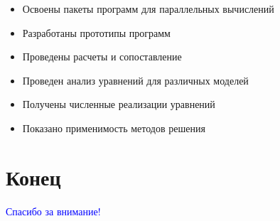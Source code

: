 \begin{frame}
\frametitle{\insertsection}
\framesubtitle{\insertsubsection}

\begin{itemize}
    \item Освоены пакеты программ для параллельных вычислений
    \item Разработаны прототипы программ
    \item Проведены расчеты и сопоставление
    \item Проведен анализ уравнений для различных моделей
    \item Получены численные реализации уравнений
    \item Показано применимость методов решения
\end{itemize}
\end{frame}


\section{Конец}

\begin{frame}[plain]
\centering
\btVFill
\textcolor{Blue}{\Large Спасибо за внимание!}
\btVFill
\end{frame}
